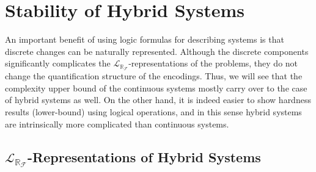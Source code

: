 \documentclass[10pt]{article}
\theoremstyle{plain}
\theoremstyle{definition}
\newcommand{\lrf}{\mathcal{L}_{\mathbb{R}_{\mathcal{F}}}}
\begin{document}
\section{Stability of Hybrid Systems}

An important benefit of using logic formulas for describing systems is that discrete changes can be naturally represented.  Although the discrete components significantly complicates the $\lrf$-representations of the problems, they do not change the quantification structure of the encodings. Thus, we will see that the complexity upper bound of the continuous systems mostly carry over to the case of hybrid systems as well. On the other hand, it is indeed easier to show hardness results (lower-bound) using logical operations, and in this sense hybrid systems are intrinsically more complicated than continuous systems. 

\subsection{{\large$\lrf$}-Representations of Hybrid Systems}\label{language}
\end{document}
